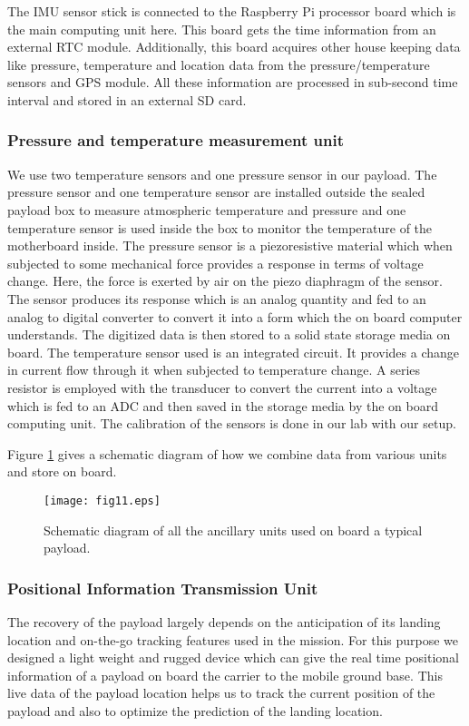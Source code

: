 The IMU sensor stick is connected to the Raspberry Pi processor board which is
the main computing unit here. This board gets the time information from an
external RTC module. Additionally, this board acquires other house keeping data
like pressure, temperature and location data from the pressure/temperature
sensors and GPS module. All these information are processed in sub-second time
interval and stored in an external SD card. 

\subsubsection{Pressure and temperature measurement unit}
\label{sssec:ptu}
We use two temperature sensors and one pressure sensor in our payload.
The pressure sensor and one temperature sensor are installed outside the
sealed payload box to measure atmospheric temperature and pressure and
one temperature sensor is used inside the box to monitor the temperature
of the motherboard inside. The pressure sensor is a piezoresistive material which when
subjected to some mechanical force provides a response in terms of
voltage change. Here, the force is exerted by air on the piezo
diaphragm of the sensor. The sensor produces its response which is
an analog quantity and fed to an analog to digital converter to convert
it into a form which the on board computer understands. The digitized
data is then stored to a solid state storage media on board. The
temperature sensor used is an integrated circuit. It provides a
change in current flow through it when subjected to temperature
change. A series resistor is employed with the transducer to
convert the current into a voltage which is fed to an ADC and
then saved in the storage media by the on board computing unit. The
calibration of the sensors is done in our lab with our setup.

Figure \ref{fig:allunit} gives 
a schematic diagram of how we combine data from various units and store on board.

\begin{figure}[h]
  \centering
  \texttt{[image: fig11.eps]}
  \caption{Schematic diagram of all the ancillary units used on board a typical payload.}
   \label{fig:allunit}
\end{figure}

\subsubsection{Positional Information Transmission Unit}
\label{sssec:pitu}
The recovery of the payload largely depends on the anticipation of its
landing location and on-the-go tracking features used in the mission. For this
purpose we designed a light weight and rugged device which can give the real
time positional information of a payload on board the carrier to the mobile
ground base. This live data of the payload location helps us to track the
current position of the payload and also to optimize the prediction of the
landing location.

